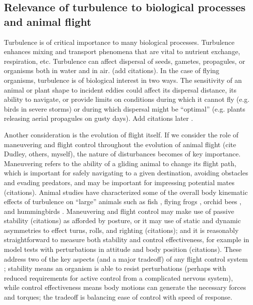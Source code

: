 \subsection{Relevance of turbulence to biological processes and animal flight}
Turbulence is of critical importance to many biological processes.  Turbulence enhances mixing and transport phenomena that are vital to nutrient exchange, respiration, etc.  Turbulence can affect dispersal of seeds, gametes, propagules, or organisms both in water and in air.  (add citations).  In the case of flying organisms, turbulence is of biological interest in two ways.  The sensitivity of an animal or plant shape to incident eddies could affect its dispersal distance, its ability to navigate, or provide limits on conditions during which it cannot fly (e.g. birds in severe storms) or during which dispersal might be ``optimal'' (e.g. plants releasing aerial propagules on gusty days).  Add citations later \citep{Denny:1998, Feitl:2010, McCay:2003, Pavlov:2009, Webb:2010, Reynolds:2010, Lupandin:2005}. 

Another consideration is the evolution of flight itself.  If we consider the role of maneuvering and flight control throughout the evolution of animal flight (cite Dudley, others, myself), the nature of disturbances becomes of key importance.  Maneuvering refers to the ability of a gliding animal to change its flight path, which is important for safely navigating to a given destination, avoiding obstacles and evading predators, and may be important for impressing potential mates (citations).  Animal studies have characterized some of the overall body kinematic effects of turbulence on ``large'' animals such as fish \citep{Feitl:2010, Tritico:2010, Pavlov:2009, Lupandin:2005}, flying frogs \cite{McCay:2003, McCay:2004}, orchid bees \citep{Combes:2009}, and hummingbirds \citep{Ortega:2012x}. Maneuvering and flight control may make use of passive stability (citations) as afforded by posture, or it may use of static and dynamic asymmetries to effect turns, rolls, and righting (citations); and it is reasonably straightforward to measure both stability and control effectiveness, for example in model tests with perturbations in attitude and body position (citations).  These address two of the key aspects (and a major tradeoff) of any flight control system \citep{McCormick:1976}; stability means an organism is able to resist perturbations (perhaps with reduced requirements for active control from a complicated nervous system), while control effectiveness means body motions can generate the necessary forces and torques; the tradeoff is balancing ease of control with speed of response.  

